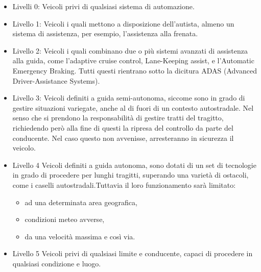 \documentclass[14pt]{extarticle}
\begin{document}
\begin{itemize}
\item Livelli 0:
Veicoli privi di qualsiasi sistema di automazione.
\item Livello 1: 
Veicoli  i quali mettono a disposizione dell'autista, almeno un sistema di assistenza, per esempio, l'assistenza alla frenata.
\item Livello 2:
Veicoli i quali combinano due o più sistemi avanzati di assistenza alla guida, come l'adaptive cruise control, Lane-Keeping assist, e l'Automatic Emergency Braking. Tutti questi rientrano sotto la dicitura ADAS (Advanced Driver-Assistance Systems). 
\item Livello 3:
Veicoli definiti a guida semi-autonoma, siccome sono in grado di  gestire situazioni variegate, anche al di fuori di un contesto autostradale. Nel senso che si prendono la responsabilità di gestire tratti del tragitto, richiedendo però alla fine di questi la ripresa del controllo da parte del conducente. Nel caso questo non avvenisse, arresteranno in sicurezza il  veicolo.
\item Livello 4
Veicoli definiti a guida autonoma, sono dotati di un set di tecnologie in grado di procedere per lunghi tragitti, superando una varietà di ostacoli, come i caselli autostradali.Tuttavia il loro funzionamento sarà limitato:
\begin{itemize}
\item ad una determinata area geografica,
\item condizioni meteo avverse,
\item da una velocità massima e così via.
\end{itemize}
\item Livello 5
Veicoli privi di qualsiasi limite e conducente, capaci di procedere in qualsiasi condizione e luogo.
\end{itemize}

\end{document}
